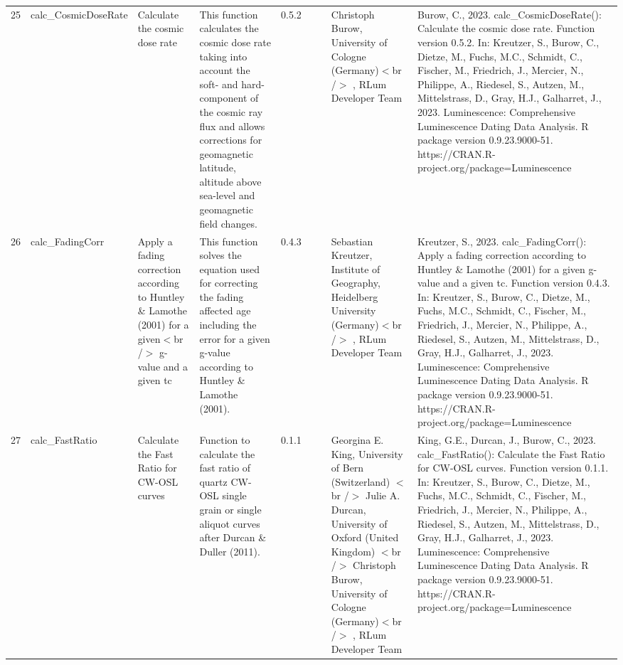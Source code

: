 \begin{table}[ht]
\begin{tabular}{rllllllll}
 \\ 
  25 & calc\_CosmicDoseRate & Calculate the cosmic dose rate & This function calculates the cosmic dose rate taking into account the soft- and hard-component of the cosmic ray flux and allows corrections for geomagnetic latitude, altitude above sea-level and geomagnetic field changes. & 0.5.2
 &  &  & Christoph Burow, University of Cologne (Germany)$<$br /$>$ , RLum Developer Team & Burow, C., 2023. calc\_CosmicDoseRate(): Calculate the cosmic dose rate. Function version 0.5.2. In: Kreutzer, S., Burow, C., Dietze, M., Fuchs, M.C., Schmidt, C., Fischer, M., Friedrich, J., Mercier, N., Philippe, A., Riedesel, S., Autzen, M., Mittelstrass, D., Gray, H.J., Galharret, J., 2023. Luminescence: Comprehensive Luminescence Dating Data Analysis. R package version 0.9.23.9000-51. https://CRAN.R-project.org/package=Luminescence
 \\ 
  26 & calc\_FadingCorr & Apply a fading correction according to Huntley \& Lamothe (2001) for a given$<$br /$>$ g-value and a given tc & This function solves the equation used for correcting the fading affected age including the error for a given g-value according to Huntley \& Lamothe (2001). & 0.4.3
 &  &  & Sebastian Kreutzer, Institute of Geography, Heidelberg University (Germany)$<$br /$>$ , RLum Developer Team & Kreutzer, S., 2023. calc\_FadingCorr(): Apply a fading correction according to Huntley \& Lamothe (2001) for a given g-value and a given tc. Function version 0.4.3. In: Kreutzer, S., Burow, C., Dietze, M., Fuchs, M.C., Schmidt, C., Fischer, M., Friedrich, J., Mercier, N., Philippe, A., Riedesel, S., Autzen, M., Mittelstrass, D., Gray, H.J., Galharret, J., 2023. Luminescence: Comprehensive Luminescence Dating Data Analysis. R package version 0.9.23.9000-51. https://CRAN.R-project.org/package=Luminescence
 \\ 
  27 & calc\_FastRatio & Calculate the Fast Ratio for CW-OSL curves & Function to calculate the fast ratio of quartz CW-OSL single grain or single aliquot curves after Durcan \& Duller (2011). & 0.1.1
 &  &  & Georgina E. King, University of Bern (Switzerland)  $<$br /$>$ Julie A. Durcan, University of Oxford (United Kingdom)  $<$br /$>$ Christoph Burow, University of Cologne (Germany)$<$br /$>$ , RLum Developer Team & King, G.E., Durcan, J., Burow, C., 2023. calc\_FastRatio(): Calculate the Fast Ratio for CW-OSL curves. Function version 0.1.1. In: Kreutzer, S., Burow, C., Dietze, M., Fuchs, M.C., Schmidt, C., Fischer, M., Friedrich, J., Mercier, N., Philippe, A., Riedesel, S., Autzen, M., Mittelstrass, D., Gray, H.J., Galharret, J., 2023. Luminescence: Comprehensive Luminescence Dating Data Analysis. R package version 0.9.23.9000-51. https://CRAN.R-project.org/package=Luminescence

\end{tabular}
\end{table}

